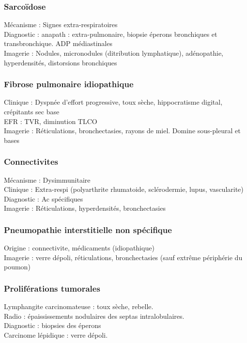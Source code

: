 \documentclass{book}
\begin{document}
\subsubsection{Sarcoïdose}
\label{sec:org37f07dd}
Mécanisme : Signes extra-respiratoires\\
Diagnostic : anapath : extra-pulmonaire, biopsie éperons bronchiques et transbronchique. ADP médiastinales \\
Imagerie : Nodules, micronodules (ditribution lymphatique), adénopathie, hyperdensités, distorsions bronchiques

\subsubsection{Fibrose pulmonaire idiopathique}
\label{sec:org954e38b}
Clinique : Dyspnée d'effort progressive, toux sèche, hippocratisme digital, crépitants sec base\\
EFR : TVR, diminution TLCO\\
Imagerie : Réticulations, bronchectasies, rayons de miel. Domine sous-pleural et bases

\subsubsection{Connectivites}
\label{sec:org2b1f1e8}
Mécanisme : Dysimmunitaire\\
Clinique : Extra-respi (polyarthrite rhumatoide, sclérodermie, lupus, vascularite)\\
Diagnostic : Ac spécifiques\\
Imagerie : Réticulations, hyperdensités, bronchectasies

\subsubsection{Pneumopathie interstitielle non spécifique}
\label{sec:orga604d4d}
Origine : connectivite, médicaments (idiopathique)\\
Imagerie : verre dépoli, réticulations, bronchectasies (sauf extrême périphérie du poumon)

\subsubsection{Proliférations tumorales}
\label{sec:org89a3601}
Lymphangite carcinomateuse : toux sèche, rebelle. \\
Radio : épaississements nodulaires des septas intralobulaires.\\
Diagnostic : biopsies des éperons\\
Carcinome lépidique : verre dépoli. 
\end{document}
